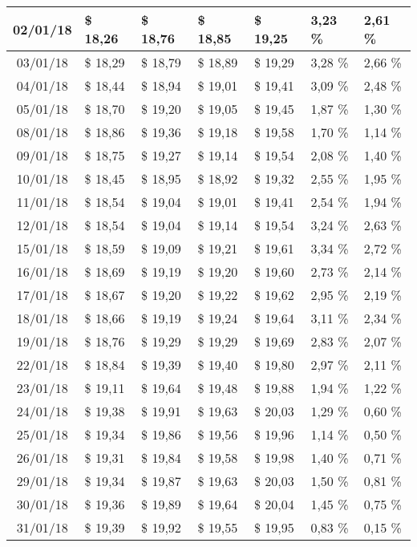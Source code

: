 \begin{center}
\begin{longtable}{|c|p{1.5cm}|p{1.5cm}|p{1.5cm}|p{1.5cm}|p{1.5cm}|p{1.5cm}|}
02/01/18 & \$ 18,26 & \$ 18,76 & \$ 18,85 & \$ 19,25 & 3,23 \% & 2,61 \% \\ \hline
03/01/18 & \$ 18,29 & \$ 18,79 & \$ 18,89 & \$ 19,29 & 3,28 \% & 2,66 \% \\ \hline
04/01/18 & \$ 18,44 & \$ 18,94 & \$ 19,01 & \$ 19,41 & 3,09 \% & 2,48 \% \\ \hline
05/01/18 & \$ 18,70 & \$ 19,20 & \$ 19,05 & \$ 19,45 & 1,87 \% & 1,30 \% \\ \hline
08/01/18 & \$ 18,86 & \$ 19,36 & \$ 19,18 & \$ 19,58 & 1,70 \% & 1,14 \% \\ \hline
09/01/18 & \$ 18,75 & \$ 19,27 & \$ 19,14 & \$ 19,54 & 2,08 \% & 1,40 \% \\ \hline
10/01/18 & \$ 18,45 & \$ 18,95 & \$ 18,92 & \$ 19,32 & 2,55 \% & 1,95 \% \\ \hline
11/01/18 & \$ 18,54 & \$ 19,04 & \$ 19,01 & \$ 19,41 & 2,54 \% & 1,94 \% \\ \hline
12/01/18 & \$ 18,54 & \$ 19,04 & \$ 19,14 & \$ 19,54 & 3,24 \% & 2,63 \% \\ \hline
15/01/18 & \$ 18,59 & \$ 19,09 & \$ 19,21 & \$ 19,61 & 3,34 \% & 2,72 \% \\ \hline
16/01/18 & \$ 18,69 & \$ 19,19 & \$ 19,20 & \$ 19,60 & 2,73 \% & 2,14 \% \\ \hline
17/01/18 & \$ 18,67 & \$ 19,20 & \$ 19,22 & \$ 19,62 & 2,95 \% & 2,19 \% \\ \hline
18/01/18 & \$ 18,66 & \$ 19,19 & \$ 19,24 & \$ 19,64 & 3,11 \% & 2,34 \% \\ \hline
19/01/18 & \$ 18,76 & \$ 19,29 & \$ 19,29 & \$ 19,69 & 2,83 \% & 2,07 \% \\ \hline
22/01/18 & \$ 18,84 & \$ 19,39 & \$ 19,40 & \$ 19,80 & 2,97 \% & 2,11 \% \\ \hline
23/01/18 & \$ 19,11 & \$ 19,64 & \$ 19,48 & \$ 19,88 & 1,94 \% & 1,22 \% \\ \hline
24/01/18 & \$ 19,38 & \$ 19,91 & \$ 19,63 & \$ 20,03 & 1,29 \% & 0,60 \% \\ \hline
25/01/18 & \$ 19,34 & \$ 19,86 & \$ 19,56 & \$ 19,96 & 1,14 \% & 0,50 \% \\ \hline
26/01/18 & \$ 19,31 & \$ 19,84 & \$ 19,58 & \$ 19,98 & 1,40 \% & 0,71 \% \\ \hline
29/01/18 & \$ 19,34 & \$ 19,87 & \$ 19,63 & \$ 20,03 & 1,50 \% & 0,81 \% \\ \hline
30/01/18 & \$ 19,36 & \$ 19,89 & \$ 19,64 & \$ 20,04 & 1,45 \% & 0,75 \% \\ \hline
31/01/18 & \$ 19,39 & \$ 19,92 & \$ 19,55 & \$ 19,95 & 0,83 \% & 0,15 \% \\ \hline

\end{longtable}
\end{center}
